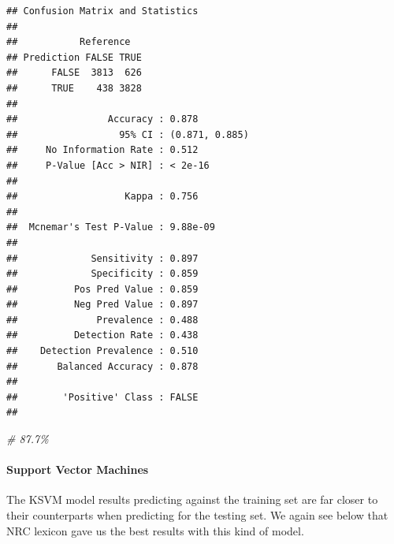 \documentclass[
]{article}
\newenvironment{Shaded}{\begin{snugshade}}{\end{snugshade}}
\newcommand{\CommentTok}[1]{\textcolor[rgb]{0.56,0.35,0.01}{\textit{#1}}}
\newcommand{\FunctionTok}[1]{\textcolor[rgb]{0.00,0.00,0.00}{#1}}
\newcommand{\NormalTok}[1]{#1}
\newcommand{\SpecialCharTok}[1]{\textcolor[rgb]{0.00,0.00,0.00}{#1}}
\begin{document}
\begin{Shaded}
\end{Shaded}

\begin{verbatim}
## Confusion Matrix and Statistics
## 
##           Reference
## Prediction FALSE TRUE
##      FALSE  3813  626
##      TRUE    438 3828
##                                         
##                Accuracy : 0.878         
##                  95% CI : (0.871, 0.885)
##     No Information Rate : 0.512         
##     P-Value [Acc > NIR] : < 2e-16       
##                                         
##                   Kappa : 0.756         
##                                         
##  Mcnemar's Test P-Value : 9.88e-09      
##                                         
##             Sensitivity : 0.897         
##             Specificity : 0.859         
##          Pos Pred Value : 0.859         
##          Neg Pred Value : 0.897         
##              Prevalence : 0.488         
##          Detection Rate : 0.438         
##    Detection Prevalence : 0.510         
##       Balanced Accuracy : 0.878         
##                                         
##        'Positive' Class : FALSE         
## 
\end{verbatim}

\begin{Shaded}
\begin{Highlighting}[]
\CommentTok{\# 87.7\%}
\end{Highlighting}
\end{Shaded}

\hypertarget{support-vector-machines-1}{%
\paragraph{Support Vector Machines}\label{support-vector-machines-1}}

The KSVM model results predicting against the training set are far
closer to their counterparts when predicting for the testing set. We
again see below that NRC lexicon gave us the best results with this kind
of model.

\begin{Shaded}
\end{Shaded}
\end{document}
